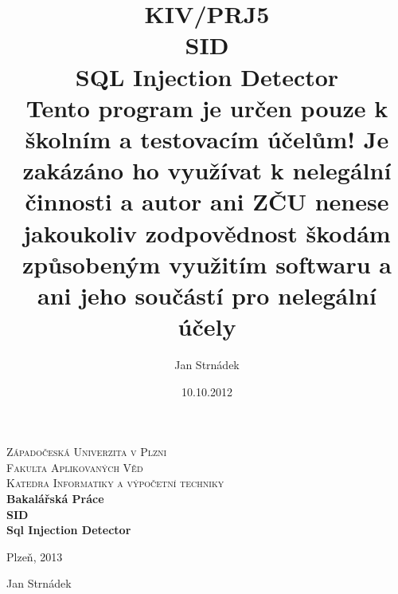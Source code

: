 \documentclass[12pt, a4paper]{report}
\begin{document}
\author{Jan Strnádek}
\date{10.10.2012}
\title{KIV/PRJ5\\SID\\\small{SQL Injection Detector\\Tento program je určen pouze k školním a testovacím účelům! Je zakázáno ho využívat k nelegální činnosti a autor ani ZČU nenese jakoukoliv zodpovědnost škodám způsobeným využitím softwaru a ani jeho součástí pro nelegální účely}}
\begin{titlepage}
\begin{center}
\textsc{\Large Západočeská Univerzita v Plzni}
\\[0.3cm]
\textsc{\Large Fakulta Aplikovaných Věd}
\\[0.3cm]
\textsc{\Large Katedra Informatiky a výpočetní techniky}
\\[6cm]
\textbf{\LARGE Bakalářská Práce}
\\[3cm]
\textbf{\LARGE SID\\[0.3cm] Sql Injection Detector}
\\[6cm]
\begin{minipage}{0.4\textwidth}
\begin{flushleft}
\large
Plzeň, 2013
\end{flushleft}
\end{minipage}
\begin{minipage}{0.4\textwidth}
\begin{flushright} 
Jan Strnádek
\end{flushright}
\end{minipage}
\vfill
\end{center}
\end{titlepage}
\tableofcontents
\end{document}
